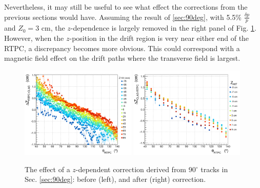 \documentclass[amsmath,amssymb,notitlepage,11pt]{revtex4-1}
\begin{document}
Nevertheless, it may still be useful to see what effect the corrections from the previous sections would have.  Assuming the result of \ref{sec:90deg}, with 5.5\% $\frac{\delta p}{p}$ and $Z_0=3$ cm, the $z$-dependence is largely removed in the right panel of Fig. \ref{fig:dz_theta_z_corr}.  However, when the $z$-position in the drift region is very near either end of the RTPC, a discrepancy becomes more obvious.  This could correspond with a magnetic field effect on the drift paths where the transverse field is largest.
\begin{figure}[htbp]\centering
    \includegraphics[width=0.49\textwidth]{pics/dz_theta_zhit_fid_A_small.png}
    \includegraphics[width=0.49\textwidth]{pics/dz_theta_zhit_afterzcorr_small.png}
    \caption{The effect of a $z$-dependent correction derived from 90$^\circ$ tracks in Sec. \ref{sec:90deg}: before (left), and after (right) correction.\label{fig:dz_theta_z_corr}}
\end{figure}

\end{document}
